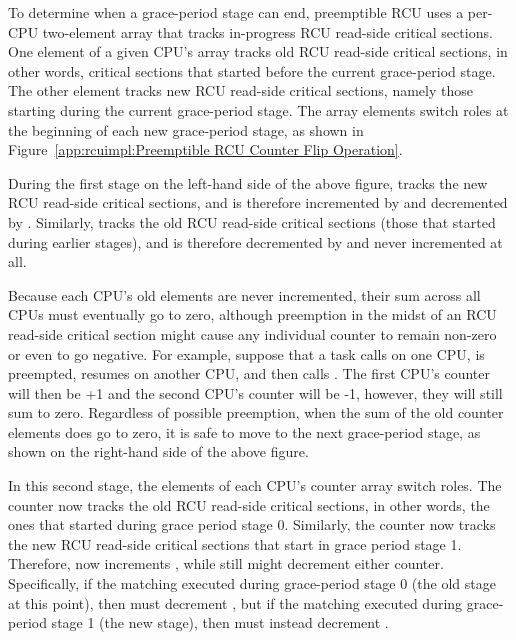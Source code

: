 To determine when a grace-period stage can end,
preemptible RCU uses a per-CPU two-element  array
that tracks in-progress RCU read-side critical sections.
One element of a given CPU's  array tracks
old RCU read-side critical sections, in other words, critical sections
that started before the current grace-period stage.
The other element tracks new RCU read-side critical
sections, namely those starting during the current grace-period stage.
The array elements switch roles at the beginning of each new grace-period
stage, as shown in
Figure~\ref{app:rcuimpl:Preemptible RCU Counter Flip Operation}.

During the first stage on the left-hand side of the above figure,
 tracks the new
RCU read-side critical sections, and is therefore incremented by
 and decremented by .
Similarly,  tracks the old RCU read-side
critical sections (those that started during earlier stages), and
is therefore decremented by  and never
incremented at all.

Because each CPU's old  elements are never
incremented, their sum across all CPUs must eventually go to zero,
although preemption in the midst of an RCU read-side critical section might
cause any individual counter to remain non-zero or even to go negative.
For example, suppose that a task calls  on
one CPU, is preempted, resumes on another CPU, and then calls
.
The first CPU's counter will then be +1 and the second CPU's counter
will be -1, however, they will still sum to zero.
Regardless of possible preemption, when the sum of the old counter
elements does go to zero, it is safe to move to the next grace-period
stage, as shown on the right-hand side of the above figure.

In this second stage, the elements of each CPU's 
counter array switch roles.
The  counter now tracks the old RCU read-side
critical sections, in other words, the ones that started during
grace period stage 0.
Similarly, the  counter now tracks the new
RCU read-side critical sections that start in grace period stage 1.
Therefore,  now increments
, while  still
might decrement either counter.
Specifically, if the matching  executed
during grace-period stage 0 (the old stage at this point), then
 must decrement ,
but if the matching  executed during
grace-period stage 1 (the new stage), then 
must instead decrement .

